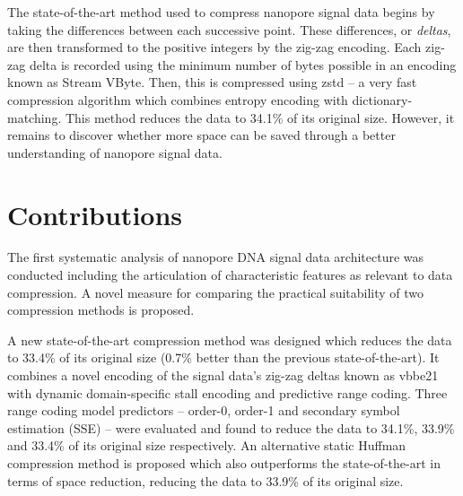 The state-of-the-art method used to compress nanopore signal data begins by
taking the differences between each successive point. These differences, or
\textit{deltas}, are then transformed to the positive integers by the zig-zag
encoding. Each zig-zag delta is recorded using the minimum number of bytes
possible in an encoding known as Stream VByte. Then, this is compressed using
zstd -- a very fast compression algorithm which combines entropy encoding with
dictionary-matching. This method reduces the data to 34.1\% of its original
size. However, it remains to discover whether more space can be saved through a
better understanding of nanopore signal data.



\section{Contributions}

The first systematic analysis of nanopore DNA signal data architecture was
conducted including the articulation of characteristic features as relevant to
data compression. A novel measure for comparing the practical suitability of two
compression methods is proposed.

A new state-of-the-art compression method was designed which reduces the data to 33.4\%
of its original size (0.7\% better than the previous state-of-the-art). It
combines a novel encoding of the signal data's zig-zag deltas known as vbbe21
with dynamic domain-specific stall encoding and predictive range coding. Three
range coding model predictors -- order-0, order-1 and secondary symbol
estimation (SSE) -- were evaluated and found to reduce the data to 34.1\%,
33.9\% and 33.4\% of its original size respectively.
An alternative static Huffman compression method is proposed which also
outperforms the state-of-the-art in terms of space reduction, reducing the data
to 33.9\% of its original size.

